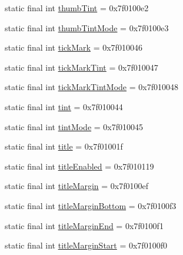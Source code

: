 \begin{CompactItemize}
\item 
static final int \hyperlink{classandroid_1_1support_1_1graphics_1_1drawable_1_1animated_1_1_r_1_1attr_35bf7dbccce67bb6e4268160943fb376}{thumbTint} = 0x7f0100e2
\item 
static final int \hyperlink{classandroid_1_1support_1_1graphics_1_1drawable_1_1animated_1_1_r_1_1attr_4effb516ccbacc8275a70347096ca08d}{thumbTintMode} = 0x7f0100e3
\item 
static final int \hyperlink{classandroid_1_1support_1_1graphics_1_1drawable_1_1animated_1_1_r_1_1attr_f1ad42ac572e79d85b4339c2a7d0fbd2}{tickMark} = 0x7f010046
\item 
static final int \hyperlink{classandroid_1_1support_1_1graphics_1_1drawable_1_1animated_1_1_r_1_1attr_7200923e1aefaf68377dfa269fe9be5a}{tickMarkTint} = 0x7f010047
\item 
static final int \hyperlink{classandroid_1_1support_1_1graphics_1_1drawable_1_1animated_1_1_r_1_1attr_7c8df95369dd034310651f9fa2acacd1}{tickMarkTintMode} = 0x7f010048
\item 
static final int \hyperlink{classandroid_1_1support_1_1graphics_1_1drawable_1_1animated_1_1_r_1_1attr_cd37accb4e6bde08c69dda1a0e66e979}{tint} = 0x7f010044
\item 
static final int \hyperlink{classandroid_1_1support_1_1graphics_1_1drawable_1_1animated_1_1_r_1_1attr_89c4c5f17af3c7b62221000d2fc07de2}{tintMode} = 0x7f010045
\item 
static final int \hyperlink{classandroid_1_1support_1_1graphics_1_1drawable_1_1animated_1_1_r_1_1attr_027e065675e38bb9f37e489350a850a3}{title} = 0x7f01001f
\item 
static final int \hyperlink{classandroid_1_1support_1_1graphics_1_1drawable_1_1animated_1_1_r_1_1attr_86525ab691b40f300d06f09f0c0c210e}{titleEnabled} = 0x7f010119
\item 
static final int \hyperlink{classandroid_1_1support_1_1graphics_1_1drawable_1_1animated_1_1_r_1_1attr_cb940d4732a0526cbb87cc288e82bf2f}{titleMargin} = 0x7f0100ef
\item 
static final int \hyperlink{classandroid_1_1support_1_1graphics_1_1drawable_1_1animated_1_1_r_1_1attr_0ffd907edd19e1d32591dee31fb08ac6}{titleMarginBottom} = 0x7f0100f3
\item 
static final int \hyperlink{classandroid_1_1support_1_1graphics_1_1drawable_1_1animated_1_1_r_1_1attr_2245b8d9993100cb8f3c85ddc3abbfe2}{titleMarginEnd} = 0x7f0100f1
\item 
static final int \hyperlink{classandroid_1_1support_1_1graphics_1_1drawable_1_1animated_1_1_r_1_1attr_9278d5a2389e2fdcb973464778730f8c}{titleMarginStart} = 0x7f0100f0

\end{CompactItemize}
